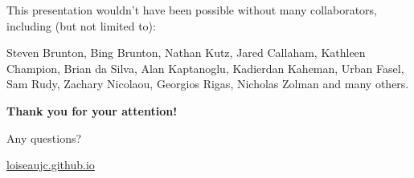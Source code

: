 \documentclass[aspectratio=169,compress,12pt,dvipsnames]{beamer}
\begin{document}

\End

\begin{frame}
    This presentation wouldn't have been possible without many collaborators, including (but not limited to): 
    
    Steven Brunton, Bing Brunton, Nathan Kutz, Jared Callaham, Kathleen Champion, Brian da Silva, Alan Kaptanoglu, Kadierdan Kaheman, Urban Fasel, Sam Rudy, Zachary Nicolaou, Georgios Rigas, Nicholas Zolman and many others.
\end{frame}
\End

\begin{frame}
    \vfill
    \begin{minipage}{.68\textwidth}
        {
            \Large
            \textbf{Thank you for your attention!}
        }
        \par\bigskip
        {
            Any questions?
        }
    \end{minipage}%
    \hfill
    \begin{minipage}{.28\textwidth}
        \centering
        \scalebox{4}{\faGithub} \par\bigskip
        \tiny
        \url{loiseaujc.github.io}
    \end{minipage}
    \vfill
\end{frame}
\end{document}
